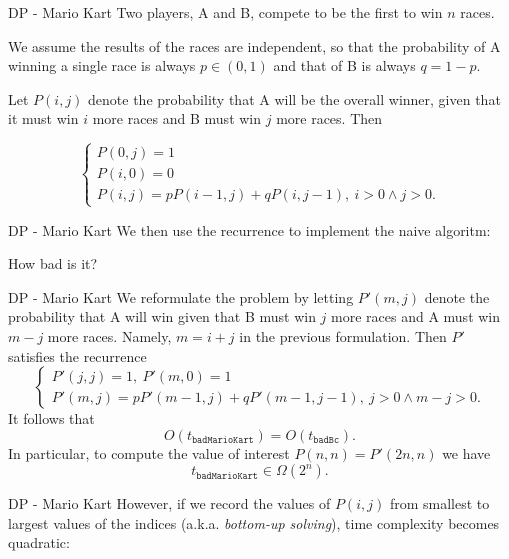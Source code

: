 \documentclass{beamer}
\begin{document}
\begin{frame}{DP - Mario Kart}
	Two players, A and B, compete to be the first to win $n$ races.

	\bigskip
	We assume the results of the races are independent, so that the probability
	of A winning a single race is always $p \in (0,1)$ and  that of B is always
	$q = 1-p$.

	\bigskip
	Let $P(i,j)$ denote the probability that A will be the overall winner, given
	that it must win $i$ more races and B must win $j$ more races. Then

	\[
		\begin{cases}
			P(0,j) = 1\\
			P(i,0) = 0\\ 
			P(i,j) = pP(i-1,j) + qP(i,j-1),\ i > 0 \land j > 0.
		\end{cases}
	\]
\end{frame}

%

\begin{frame}{DP - Mario Kart}
	We then use the recurrence to implement the naive algoritm:
	
	How bad is it?
\end{frame}

%

\begin{frame}{DP - Mario Kart}
	We reformulate the problem by letting $P'(m,j)$ denote the probability that
	A will win given that B must win $j$ more races and A must win $m-j$ more
	races. Namely, $m = i+j$ in the previous formulation. Then $P'$ satisfies
	the recurrence
	\[
		\begin{cases}
			P'(j,j)= 1,\ P'(m,0)= 1\\
			P'(m,j) = pP'(m-1,j) + qP'(m-1,j-1),\ j > 0 \land m-j > 0.
		\end{cases}
	\]
	It follows that
	\[
		O(t_{\texttt{badMarioKart}}) = O(t_{\texttt{badBc}}).
	\]
	In particular, to compute the value of interest $P(n,n) = P'(2n,n)$ we have
	\[
		t_{\texttt{badMarioKart}} \in \Omega(2^n).
	\]
\end{frame}

%

\begin{frame}{DP - Mario Kart}
	However, if we record the values of $P(i,j)$ from smallest to largest values
	of the indices (a.k.a. \emph{bottom-up solving}), time complexity becomes
	quadratic:
	
\end{frame}
\end{document}
